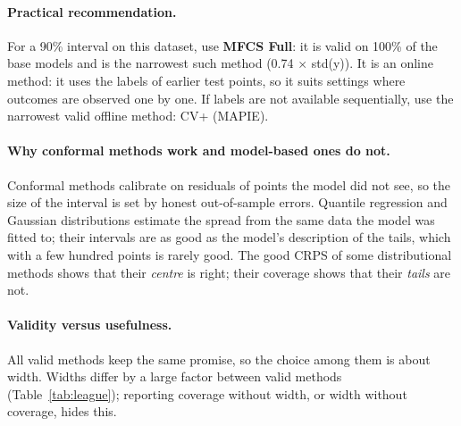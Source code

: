 \documentclass[11pt]{article}
\begin{document}
\paragraph{Practical recommendation.} For a 90\% interval on this dataset, use \textbf{MFCS Full}: it is valid on 100\% of the base models and is the narrowest such method (0.74 $\times$ std(y)). It is an online method: it uses the labels of earlier test points, so it suits settings where outcomes are observed one by one. If labels are not available sequentially, use the narrowest valid offline method: CV+ (MAPIE).
\paragraph{Why conformal methods work and model-based ones do not.} Conformal methods calibrate on residuals of points the model did not
see, so the size of the interval is set by honest out-of-sample errors. Quantile regression and Gaussian distributions estimate the spread
from the same data the model was fitted to; their intervals are as good as the model's description of the tails, which with a few hundred
points is rarely good. The good CRPS of some distributional methods shows that their \emph{centre} is right; their coverage shows that their
\emph{tails} are not.
\paragraph{Validity versus usefulness.} All valid methods keep the same promise, so the choice among them is about width. Widths differ by
a large factor between valid methods (Table~\ref{tab:league}); reporting coverage without width, or width without coverage, hides this.
\end{document}
